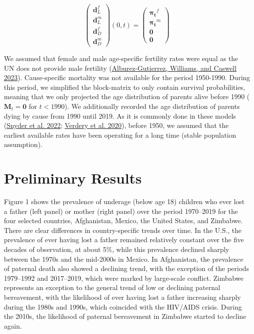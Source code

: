 \documentclass[
  11pt,
  letterpaper,
]{article}
\begin{document}
\[\begin{pmatrix} \boldsymbol{d}^f_L \\ 
\boldsymbol{d}^m_L \\ 
\hline \boldsymbol{d}^f_D \\ 
\boldsymbol{d}^m_D 
\end{pmatrix}(0, t)
=
\begin{pmatrix} \boldsymbol{\pi_t}^f \\ 
\boldsymbol{\pi_t}^m \\ 
\hline \boldsymbol{0} \\ 
\boldsymbol{0} 
\end{pmatrix}
\]

We assumed that female and male age-specific fertility rates were equal as the UN does not provide male fertility (\protect\hyperlink{ref-alburez2023projections}{Alburez-Gutierrez, Williams, and Caswell 2023}).
Cause-specific mortality was not available for the period 1950-1990. During this period, we simplified the block-matrix to only contain survival probabilities, meaning that we only projected the age distribution of parents alive before 1990 (\(\boldsymbol{M}_t = \boldsymbol{0}\) for \(t < 1990\)). We additionally recorded the age distribution of parents dying by cause from 1990 until 2019. As it is commonly done in these models (\protect\hyperlink{ref-snyder2022covid}{Snyder et al. 2022}; \protect\hyperlink{ref-verdery2020covid}{Verdery et al. 2020}), before 1950, we assumed that the earliest available rates have been operating for a long time (stable population assumption).

\hypertarget{preliminary-results}{%
\section{Preliminary Results}\label{preliminary-results}}

Figure 1 shows the prevalence of underage (below age 18) children who ever lost a father (left panel) or mother (right panel) over the period 1970--2019 for the four selected countries, Afghanistan, Mexico, the United States, and Zimbabwe. There are clear differences in country-specific trends over time. In the U.S., the prevalence of ever having lost a father remained relatively constant over the five decades of observation, at about 5\%, while this prevalence declined sharply between the 1970s and the mid-2000s in Mexico. In Afghanistan, the prevalence of paternal death also showed a declining trend, with the exception of the periods 1979--1992 and 2017--2019, which were marked by large-scale conflict. Zimbabwe represents an exception to the general trend of low or declining paternal bereavement, with the likelihood of ever having lost a father increasing sharply during the 1980s and 1990s, which coincided with the HIV/AIDS crisis. During the 2010s, the likelihood of paternal bereavement in Zimbabwe started to decline again.
\end{document}
